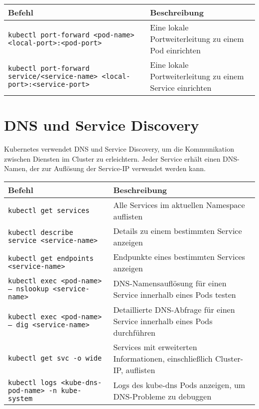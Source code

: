 \noindent
\begin{tabular}{|p{}|p{}|}
\hline
\textbf{Befehl} & \textbf{Beschreibung} \\
\hline
\texttt{kubectl port-forward <pod-name> <local-port>:<pod-port>} & Eine lokale Portweiterleitung zu einem Pod einrichten \\
\texttt{kubectl port-forward service/<service-name> <local-port>:<service-port>} & Eine lokale Portweiterleitung zu einem Service einrichten \\
\hline
\end{tabular}

\section{DNS und Service Discovery}
Kubernetes verwendet DNS und Service Discovery, um die Kommunikation zwischen Diensten im Cluster zu erleichtern. Jeder Service erhält einen DNS-Namen, der zur Auflösung der Service-IP verwendet werden kann. \\

\noindent
\begin{tabular}{|p{}|p{}|}
\hline
\textbf{Befehl} & \textbf{Beschreibung} \\
\hline
\texttt{kubectl get services} & Alle Services im aktuellen Namespace auflisten \\
\texttt{kubectl describe service <service-name>} & Details zu einem bestimmten Service anzeigen \\
\texttt{kubectl get endpoints <service-name>} & Endpunkte eines bestimmten Services anzeigen \\
\texttt{kubectl exec <pod-name> -- nslookup <service-name>} & DNS-Namensauflösung für einen Service innerhalb eines Pods testen \\
\texttt{kubectl exec <pod-name> -- dig <service-name>} & Detaillierte DNS-Abfrage für einen Service innerhalb eines Pods durchführen \\
\texttt{kubectl get svc -o wide} & Services mit erweiterten Informationen, einschließlich Cluster-IP, auflisten \\
\texttt{kubectl logs <kube-dns-pod-name> -n kube-system} & Logs des kube-dns Pods anzeigen, um DNS-Probleme zu debuggen \\
\hline
\end{tabular}
